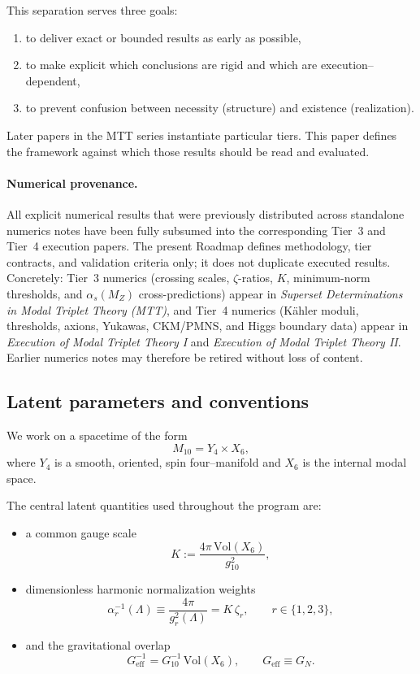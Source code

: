 \documentclass[11pt]{article}
\begin{document}
This separation serves three goals:
\begin{enumerate}
  \item to deliver exact or bounded results as early as possible,
  \item to make explicit which conclusions are rigid and which are
        execution--dependent,
  \item to prevent confusion between necessity (structure) and existence
        (realization).
\end{enumerate}

Later papers in the MTT series instantiate particular tiers.
This paper defines the framework against which those results should be
read and evaluated.
\paragraph{Numerical provenance.}
All explicit numerical results that were previously distributed across standalone
numerics notes have been fully subsumed into the corresponding Tier~3 and Tier~4
execution papers. The present Roadmap defines methodology, tier contracts, and
validation criteria only; it does not duplicate executed results. Concretely:
Tier~3 numerics (crossing scales, $\zeta$-ratios, $K$, minimum-norm thresholds,
and $\alpha_s(M_Z)$ cross-predictions) appear in \emph{Superset Determinations in
Modal Triplet Theory (MTT)}, and Tier~4 numerics (K\"ahler moduli, thresholds,
axions, Yukawas, CKM/PMNS, and Higgs boundary data) appear in
\emph{Execution of Modal Triplet Theory I} and \emph{Execution of Modal Triplet
Theory II}. Earlier numerics notes may therefore be retired without loss of content.

\subsection{Latent parameters and conventions}

We work on a spacetime of the form
\[
M_{10} = Y_4 \times X_6 ,
\]
where $Y_4$ is a smooth, oriented, spin four--manifold and $X_6$ is the
internal modal space.

The central latent quantities used throughout the program are:
\begin{itemize}
  \item a common gauge scale
  \[
  K := \frac{4\pi\,\mathrm{Vol}(X_6)}{g_{10}^2} ,
  \]
  \item dimensionless harmonic normalization weights
  \[
  \alpha_r^{-1}(\Lambda) \equiv \frac{4\pi}{g_r^2(\Lambda)} = K\,\zeta_r,
  \qquad r \in \{1,2,3\},
  \]
  \item and the gravitational overlap
  \[
  G_{\mathrm{eff}}^{-1} = G_{10}^{-1}\,\mathrm{Vol}(X_6),
  \qquad G_{\mathrm{eff}} \equiv G_N .
  \]
\end{itemize}
\end{document}
